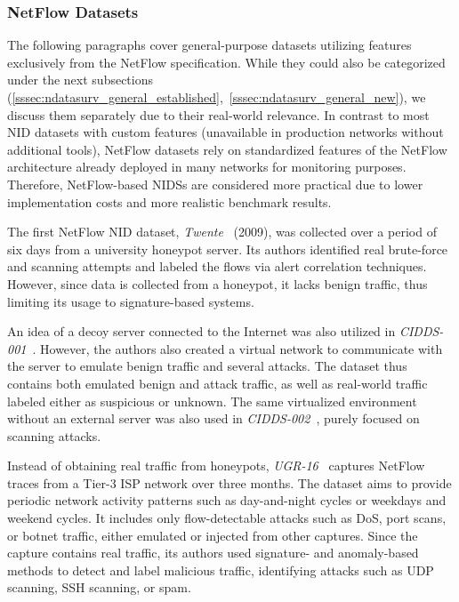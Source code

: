 \subsubsection{NetFlow Datasets}
\label{sssec:ndatasurv_general_netflow}

The following paragraphs cover general-purpose datasets utilizing features exclusively from the NetFlow specification. While they could also be categorized under the next subsections (\ref{sssec:ndatasurv_general_established},~\ref{sssec:ndatasurv_general_new}), we discuss them separately due to their real-world relevance. In contrast to most NID datasets with custom features (unavailable in production networks without additional tools), NetFlow datasets rely on standardized features of the NetFlow architecture already deployed in many networks for monitoring purposes. Therefore, NetFlow-based NIDSs are considered more practical due to lower implementation costs and more realistic benchmark results.

The first NetFlow NID dataset, \emph{Twente}~\cite{sperotto2009_twente_dataset} (2009), was collected over a period of six days from a university honeypot server. Its authors identified real brute-force and scanning attempts and labeled the flows via alert correlation techniques. However, since data is collected from a honeypot, it lacks benign traffic, thus limiting its usage to signature-based systems.

An idea of a decoy server connected to the Internet was also utilized in \emph{CIDDS-001}~\cite{ring2017_cidds001}. However, the authors also created a virtual network to communicate with the server to emulate benign traffic and several attacks. The dataset thus contains both emulated benign and attack traffic, as well as real-world traffic labeled either as suspicious or unknown. The same virtualized environment without an external server was also used in \emph{CIDDS-002}~\cite{ring2017_cidds002}, purely focused on scanning attacks.

Instead of obtaining real traffic from honeypots, \emph{UGR-16}~\cite{marciafernandez2018_ugr16} captures NetFlow traces from a Tier-3 ISP network over three months. The dataset aims to provide periodic network activity patterns such as day-and-night cycles or weekdays and weekend cycles. It includes only flow-detectable attacks such as DoS, port scans, or botnet traffic, either emulated or injected from other captures. Since the capture contains real traffic, its authors used signature- and anomaly-based methods to detect and label malicious traffic, identifying attacks such as UDP scanning, SSH scanning, or spam.

